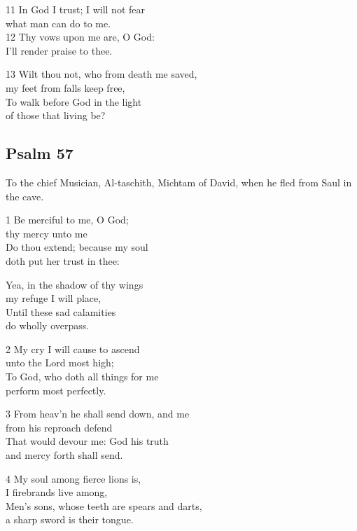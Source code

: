 11 In God I trust; I will not fear\\
what man can do to me.\\
12 Thy vows upon me are, O God:\\
I’ll render praise to thee.

13 Wilt thou not, who from death me saved,\\
my feet from falls keep free,\\
To walk before God in the light\\
of those that living be?

\begin{center}
\quad{}\quad{}
\end{center}

\subsection*{Psalm 57}

To the chief Musician, Al-taschith, Michtam
of David, when he fled from Saul in the cave.

1 Be merciful to me, O God;\\
thy mercy unto me\\
Do thou extend; because my soul\\
doth put her trust in thee:

Yea, in the shadow of thy wings\\
my refuge I will place,\\
Until these sad calamities\\
do wholly overpass.

2 My cry I will cause to ascend\\
unto the Lord most high;\\
To God, who doth all things for me\\
perform most perfectly.

3 From heav’n he shall send down, and me\\
from his reproach defend\\
That would devour me: God his truth\\
and mercy forth shall send.

4 My soul among fierce lions is,\\
I firebrands live among,\\
Men’s sons, whose teeth are spears and darts,\\
a sharp sword is their tongue.

